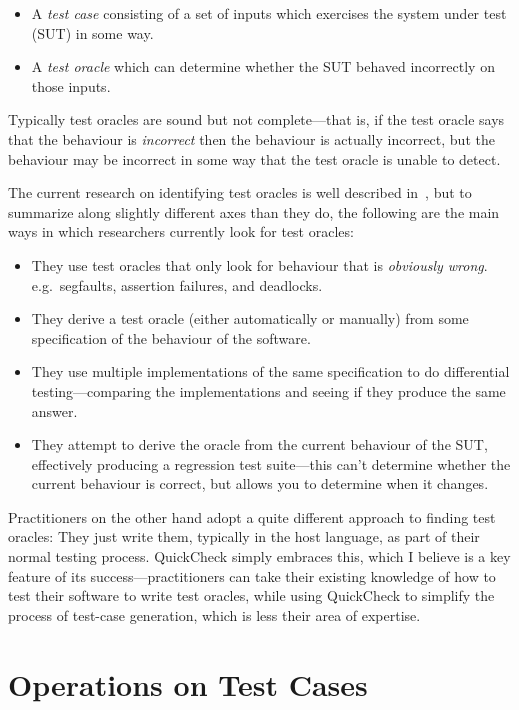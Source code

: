 \begin{itemize}
\item A \emph{test case} consisting of a set of inputs which exercises the system under test (SUT) in some way.
\item A \emph{test oracle} which can determine whether the SUT behaved incorrectly on those inputs.
\end{itemize}

Typically test oracles are sound but not complete---that is,
if the test oracle says that the behaviour is \emph{incorrect} then the behaviour is actually incorrect,
but the behaviour may be incorrect in some way that the test oracle is unable to detect.

The current research on identifying test oracles is well described in~\cite{DBLP:journals/tse/BarrHMSY15},
but to summarize along slightly different axes than they do,
the following are the main ways in which researchers currently look for test oracles:

\begin{itemize}
\item They use test oracles that only look for behaviour that is \emph{obviously wrong}.
e.g.\ segfaults, assertion failures, and deadlocks.
\item They derive a test oracle (either automatically or manually) from some specification of the behaviour of the software.
\item They use multiple implementations of the same specification to do differential testing---comparing
the implementations and seeing if they produce the same answer.
\item They attempt to derive the oracle from the current behaviour of the SUT,
effectively producing a regression test suite---this
can't determine whether the current behaviour is correct,
but allows you to determine when it changes.
\end{itemize}

Practitioners on the other hand adopt a quite different approach to finding test oracles:
They just write them,
typically in the host language,
as part of their normal testing process.
QuickCheck simply embraces this,
which I believe is a key feature of its success---practitioners
can take their existing knowledge of how to test their software to write test oracles,
while using QuickCheck to simplify the process of test-case generation,
which is less their area of expertise.

\chapter{Operations on Test Cases}

